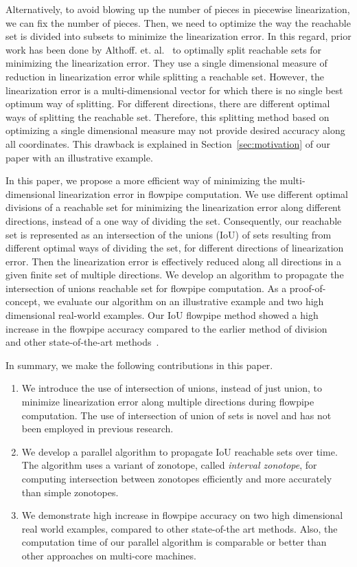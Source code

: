 Alternatively, to avoid blowing up the number of pieces in piecewise
linearization, we can fix the number of pieces.  Then, we need to
optimize the way the reachable set is divided into subsets to minimize
the linearization error.  In this regard, prior work has been done by
Althoff. et. al.~\cite{althoff2008reachability} to optimally split
reachable sets for minimizing the linearization error.  They use a
single dimensional measure of reduction in linearization error while
splitting a reachable set.  However, the linearization error is a
multi-dimensional vector for which there is no single best optimum way
of splitting.  For different directions, there are different optimal
ways of splitting the reachable set.  Therefore, this splitting method
based on optimizing a single dimensional measure may not provide
desired accuracy along all coordinates.  This drawback is explained in
Section~\ref{sec:motivation} of our paper with an illustrative
example.

In this paper, we propose a more efficient way of minimizing the
multi-dimensional linearization error in flowpipe computation.  We use
different optimal divisions of a reachable set for minimizing the
linearization error along different directions, instead of a one way
of dividing the set.  Consequently, our reachable set is represented
as an intersection of the unions (IoU) of sets resulting from
different optimal ways of dividing the set, for different directions
of linearization error.  Then the linearization error is effectively
reduced along all directions in a given finite set of multiple
directions.  We develop an algorithm to propagate the intersection of
unions reachable set for flowpipe computation.  As a proof-of-concept,
we evaluate our algorithm on an illustrative example and two high
dimensional real-world examples. Our IoU flowpipe method showed a high
increase in the flowpipe accuracy compared to the earlier method of
division~~\cite{althoff2008reachability} and other state-of-the-art
methods~\cite{chen2012taylor,althoff2013reachability}.

In summary, we make the following contributions in this paper.
\begin{enumerate}
\item We introduce the use of intersection of unions, instead of
    just union, to minimize linearization error along multiple
    directions during flowpipe computation.  The use of intersection
    of union of sets is novel and has not been employed in previous
    research.
%
\item We develop a parallel algorithm to propagate IoU reachable sets
    over time.  The algorithm uses a variant of zonotope,
    called \emph{interval zonotope}, for computing intersection
    between zonotopes efficiently and more accurately than simple zonotopes.
%
\item We demonstrate high increase in flowpipe accuracy on two high
    dimensional real world examples, compared to other state-of-the
    art methods.  Also, the computation time of our parallel
    algorithm is comparable or better than other approaches on
    multi-core machines.
\end{enumerate}
%
